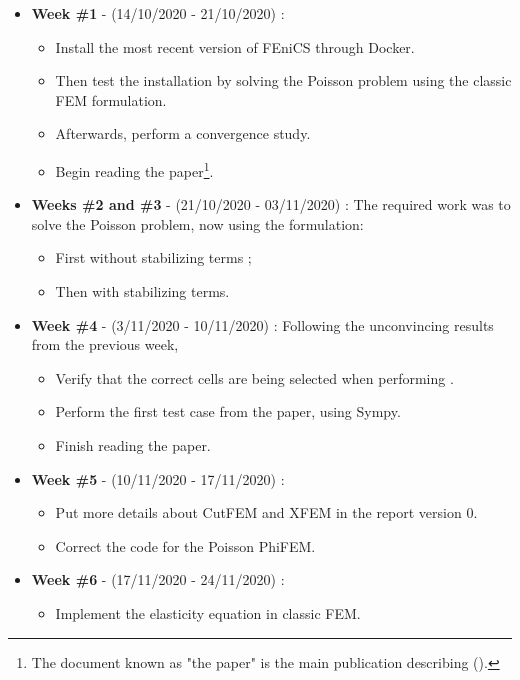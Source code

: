 \begin{itemize}
	\renewcommand{\labelitemi}{$\bullet$}
	
    \item \textbf{Week \#1} - (14/10/2020 - 21/10/2020) : \begin{itemize}
        \item Install the most recent version of FEniCS through Docker.
        \item Then test the installation by solving the Poisson problem using the classic FEM formulation.
        \item Afterwards, perform a convergence study.
        \item Begin reading the paper\footnote{The document known as "the paper" is the main publication describing \phifem (\cite{Reference3}).}.
    \end{itemize}  
    \item \textbf{Weeks \#2 and \#3} - (21/10/2020 - 03/11/2020) : The required work was to solve the Poisson problem, now using the \phifem  formulation:\begin{itemize}
        \item First without stabilizing terms ;
        \item Then with stabilizing terms.
    \end{itemize}
    \item \textbf{Week \#4} - (3/11/2020 - 10/11/2020) : Following the unconvincing results from the previous week, \begin{itemize}
        \item Verify that the correct cells are being selected when performing \phifem.
        \item Perform the first test case from the paper, using Sympy.
        \item Finish reading the paper.
    \end{itemize} 
    \item \textbf{Week \#5} - (10/11/2020 - 17/11/2020) : \begin{itemize}
        \item Put more details about CutFEM and XFEM in the report version 0.
        \item Correct the code for the Poisson PhiFEM.
    \end{itemize} 
    \item \textbf{Week \#6} - (17/11/2020 - 24/11/2020) : \begin{itemize}
        \item Implement the elasticity equation in classic FEM.

\end{itemize}
\end{itemize}
